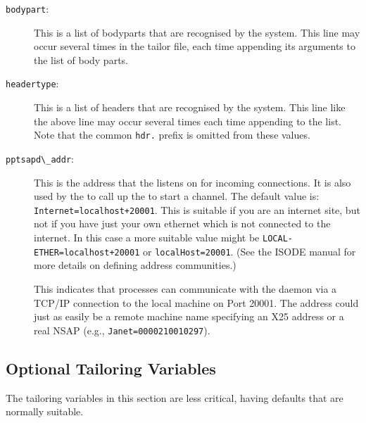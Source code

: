\begin{description}
\item[\verb+bodypart+:]\label{tai:bodypart}
This is a list of bodyparts that are recognised by the system. This
line may occur several times in the tailor file, each time appending
its arguments to the list of body parts.

\item[\verb+headertype+:]
This is a list of headers that are recognised by the system. This line
like the above line may occur several times each time appending to the
list.
Note that the common \verb+hdr.+ prefix is omitted from these values.

\item[\verb+pptsapd\_addr+:]
This is the address that the  listens on for incoming
connections.  It is also used by the  to call up the
 to start a channel.  The default value is:
\verb|Internet=localhost+20001|. This is suitable if you are an
internet site, but not if you have just your own ethernet which is not
connected to the internet. In this case a more suitable value might be
\verb|LOCAL-ETHER=localhost+20001| or \verb|localHost=20001|. (See the
ISODE manual for more details on defining address communities.)

This indicates that processes can communicate with the 
daemon via a TCP/IP connection to the local machine on Port 20001.
The address could just as easily be a remote machine name specifying
an X25 address or a real NSAP (e.g., \verb|Janet=0000210010297|).

\end{description}

\subsection{Optional Tailoring Variables}

The tailoring variables in this section are less critical, having
defaults that are normally suitable.

